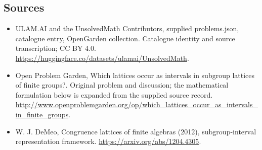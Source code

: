 \documentclass[11pt,a4paper]{article}
\begin{document}
\subsection{Sources}
\begin{itemize}
\item[S1] ULAM.AI and the UnsolvedMath Contributors, supplied problems.json, catalogue entry, OpenGarden collection. Catalogue identity and source transcription; CC BY 4.0.
\url{https://huggingface.co/datasets/ulamai/UnsolvedMath}.
\item[S2] Open Problem Garden, Which lattices occur as intervals in subgroup lattices of finite groups?. Original problem and discussion; the mathematical formulation below is expanded from the supplied source record.
\url{http://www.openproblemgarden.org/op/which_lattices_occur_as_intervals_in_finite_groups}.
\item[S3] W. J. DeMeo, Congruence lattices of finite algebras (2012), subgroup-interval representation framework.
\url{https://arxiv.org/abs/1204.4305}.
\end{itemize}
\end{document}
